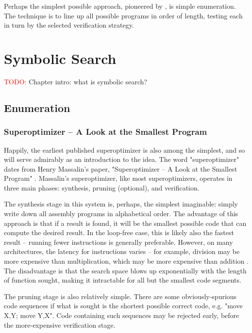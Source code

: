 \documentclass[12pt,twoside]{reedthesis}
\newcommand{\red}[1]{\textcolor{red}{#1}}
\begin{document}
    Perhaps the simplest possible approach, pioneered by \cite{massalin1987superoptimizer}, is simple enumeration. 
    The technique is to line up all possible programs in order of length, testing each in turn by the selected verification strategy. 

\chapter{Symbolic Search}
    \red{TODO:} Chapter intro: what is symbolic search?
    \section{Enumeration}
        \subsection{Superoptimizer -- A Look at the Smallest Program}
            Happily, the earliest published superoptimizer is also among the simplest, and so will serve admirably as an introduction to the idea.
            The word "superoptimizer" dates from Henry Massalin's paper, "Superoptimizer -- A Look at the Smallest Program" \cite{massalin1987superoptimizer}.
            Massalin's superoptimizer, like most superoptimizers, operates in three main phases: synthesis, pruning (optional), and verification.
                
            The synthesis stage in this system is, perhaps, the simplest imaginable: simply write down all assembly programs in alphabetical order.
            The advantage of this approach is that if a result is found, it will be the smallest possible code that can compute the desired result.
            In the loop-free case, this is likely also the fastest result -- running fewer instructions is generally preferable.
            However, on many architectures, the latency for instructions varies -- for example, division may be more expensive than multiplication, which may be more expensive than addition \cite{fog1996instructiontables}.
            The disadvantage is that the search space blows up exponentially with the length of function sought, making it intractable for all but the smallest code segments.
                
            The pruning stage is also relatively simple.
            There are some obviously-spurious code sequences if what is sought is the shortest possible correct code, e.g. "move X,Y; move Y,X".
            Code containing such sequences may be rejected early, before the more-expensive verification stage.
                
\end{document}
